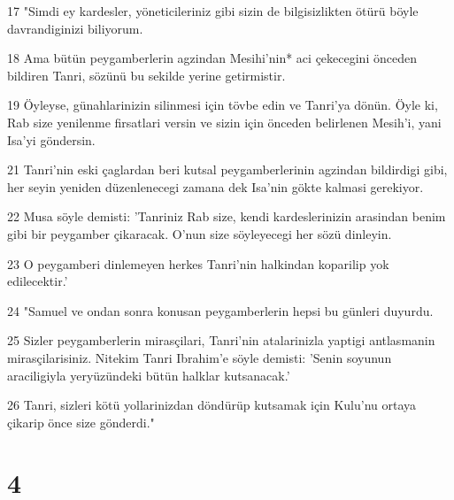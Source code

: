 \par 17 "Simdi ey kardesler, yöneticileriniz gibi sizin de bilgisizlikten ötürü böyle davrandiginizi biliyorum.
\par 18 Ama bütün peygamberlerin agzindan Mesihi'nin* aci çekecegini önceden bildiren Tanri, sözünü bu sekilde yerine getirmistir.
\par 19 Öyleyse, günahlarinizin silinmesi için tövbe edin ve Tanri'ya dönün. Öyle ki, Rab size yenilenme firsatlari versin ve sizin için önceden belirlenen Mesih'i, yani Isa'yi göndersin.
\par 21 Tanri'nin eski çaglardan beri kutsal peygamberlerinin agzindan bildirdigi gibi, her seyin yeniden düzenlenecegi zamana dek Isa'nin gökte kalmasi gerekiyor.
\par 22 Musa söyle demisti: 'Tanriniz Rab size, kendi kardeslerinizin arasindan benim gibi bir peygamber çikaracak. O'nun size söyleyecegi her sözü dinleyin.
\par 23 O peygamberi dinlemeyen herkes Tanri'nin halkindan koparilip yok edilecektir.'
\par 24 "Samuel ve ondan sonra konusan peygamberlerin hepsi bu günleri duyurdu.
\par 25 Sizler peygamberlerin mirasçilari, Tanri'nin atalarinizla yaptigi antlasmanin mirasçilarisiniz. Nitekim Tanri Ibrahim'e söyle demisti: 'Senin soyunun araciligiyla yeryüzündeki bütün halklar kutsanacak.'
\par 26 Tanri, sizleri kötü yollarinizdan döndürüp kutsamak için Kulu'nu ortaya çikarip önce size gönderdi."

\chapter{4}

